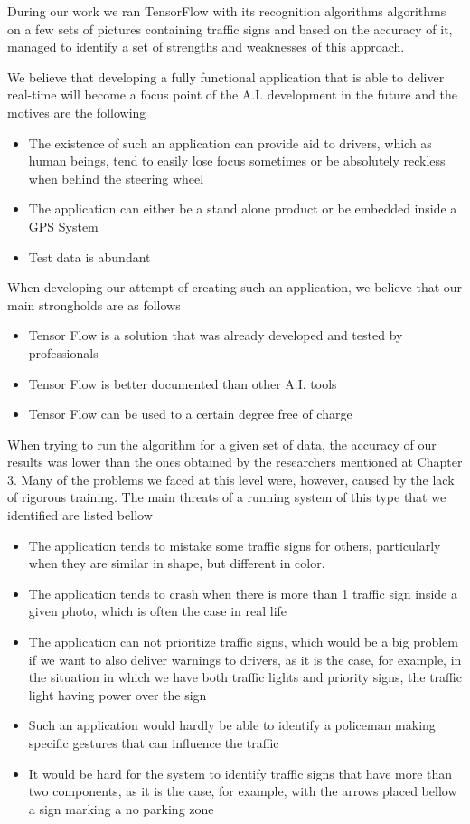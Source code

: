 \documentclass[runningheads,a4paper,11pt]{report}
\begin{document}
During our work we ran TensorFlow with its recognition algorithms algorithms on a few sets of pictures containing traffic signs and based on the accuracy of it, managed to identify a set of strengths and weaknesses of this approach. 

We believe that developing a fully functional application that is able to deliver real-time will become a focus point of the A.I. development in the future and the motives are the following

\begin{itemize}
	\item The existence of such an application can provide aid to drivers, which as human beings, tend to easily lose focus sometimes or be absolutely reckless when behind the steering wheel 
	\item The application can either be a stand alone product or be embedded inside a GPS System
	\item Test data is abundant 
\end{itemize}

When developing our attempt of creating such an application, we believe that our main strongholds are as follows
\begin{itemize}
	\item Tensor Flow is a solution that was already developed and tested by professionals
	\item Tensor Flow is better documented than other A.I. tools
	\item Tensor Flow can be used to a certain degree free of charge
\end{itemize}

When trying to run the algorithm for a given set of data, the accuracy of our results was lower than the ones obtained by the researchers mentioned at Chapter 3. Many of the problems we faced at this level were, however, caused by the lack of rigorous training. The main threats of a running system of this type that we identified are listed bellow

\begin{itemize}
	\item The application tends to mistake some traffic signs for others, particularly when they are similar in shape, but different in color.
	\item The application tends to crash when there is more than 1 traffic sign inside a given photo, which is often the case in real life
	\item The application can not prioritize traffic signs, which would be a big problem if we want to also deliver warnings to drivers, as it is the case, for example, in the situation in which we have both traffic lights and priority signs, the traffic light having power over the sign
	\item Such an application would hardly be able to identify a policeman making specific gestures that can influence the traffic
	\item It would be hard for the system to identify traffic signs that have more than two components, as it is the case, for example, with the arrows placed bellow a sign marking a no parking zone
\end{itemize}
\end{document}
